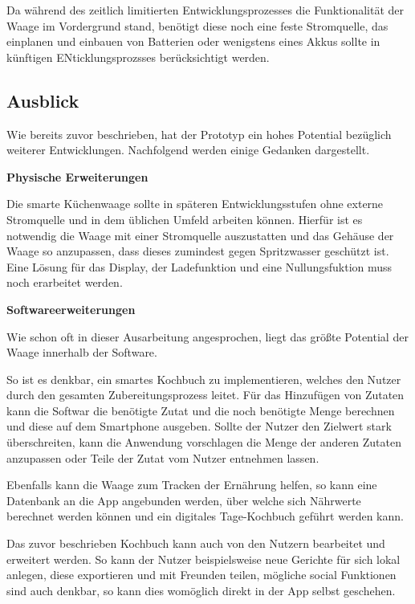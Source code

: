 Da während des zeitlich limitierten Entwicklungsprozesses die Funktionalität der Waage im Vordergrund stand, benötigt diese noch eine feste Stromquelle, das einplanen und einbauen von Batterien oder wenigstens eines Akkus sollte in künftigen ENticklungsprozsses berücksichtigt werden.

\subsection{Ausblick} %

Wie bereits zuvor beschrieben, hat der Prototyp ein hohes Potential bezüglich weiterer Entwicklungen. Nachfolgend werden einige Gedanken dargestellt.

\textbf{Physische Erweiterungen}

Die smarte Küchenwaage sollte in späteren Entwicklungsstufen ohne externe Stromquelle und in dem üblichen Umfeld arbeiten können. Hierfür ist es notwendig die Waage mit einer Stromquelle auszustatten und das Gehäuse der Waage so anzupassen, dass dieses zumindest gegen Spritzwasser geschützt ist. Eine Lösung für das Display, der Ladefunktion und eine Nullungsfuktion muss noch erarbeitet werden. 

\textbf{Softwareerweiterungen}

Wie schon oft in dieser Ausarbeitung angesprochen, liegt das größte Potential der Waage innerhalb der Software. 

So ist es denkbar, ein smartes Kochbuch zu implementieren, welches den Nutzer durch den gesamten Zubereitungsprozess leitet. Für das Hinzufügen von Zutaten kann die Softwar die benötigte Zutat und die noch benötigte Menge berechnen und diese auf dem Smartphone ausgeben. Sollte der Nutzer den Zielwert stark überschreiten, kann die Anwendung vorschlagen die Menge der anderen Zutaten anzupassen oder Teile der Zutat vom Nutzer entnehmen lassen. 

Ebenfalls kann die Waage zum Tracken der Ernährung helfen, so kann eine Datenbank an die App angebunden werden, über welche sich Nährwerte berechnet werden können und ein digitales Tage-Kochbuch geführt werden kann.
 
 Das zuvor beschrieben Kochbuch kann auch von den Nutzern bearbeitet und erweitert werden. So kann der Nutzer beispielsweise neue Gerichte für sich lokal anlegen, diese exportieren und mit Freunden teilen, mögliche social Funktionen sind auch denkbar, so kann dies womöglich direkt in der App selbst geschehen.
